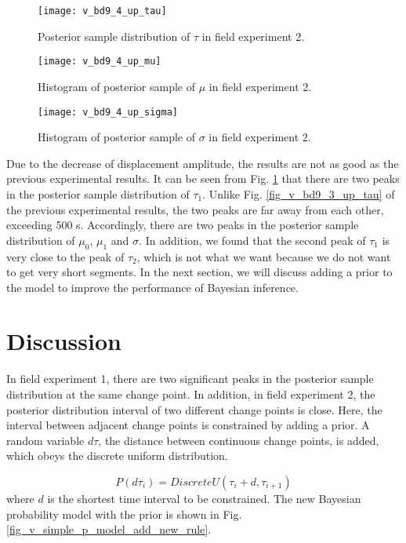 \documentclass[final,3p,times]{elsarticle}
\begin{document}
	\begin{figure}[htbp]
		\centering
		\texttt{[image: v\_bd9\_4\_up\_tau]}
		\caption{Posterior sample distribution of $\tau$ in field experiment 2.}
		\label{fig_v_bd9_4_up_tau}
	\end{figure} 
	\begin{figure}[htbp]
		\centering
		\texttt{[image: v\_bd9\_4\_up\_mu]}
		\caption{Histogram of posterior sample of $\mu$ in field experiment 2.}
		\label{fig_v_bd9_4_up_mu}
	\end{figure} 
	\begin{figure}[htbp]
		\centering
		\texttt{[image: v\_bd9\_4\_up\_sigma]}
		\caption{Histogram of posterior sample of $\sigma$ in field experiment 2.}
		\label{fig_v_bd9_4_up_sigma}
	\end{figure}
	Due to the decrease of displacement amplitude, the results are not as good as the previous experimental results. 
	It can be seen from Fig. \ref{fig_v_bd9_4_up_tau} that there are two peaks in the posterior sample distribution of $\tau_1$. Unlike Fig. \ref{fig_v_bd9_3_up_tau} of the previous experimental results, the two peaks are far away from each other, exceeding 500 s. 
	Accordingly, there are two peaks in the posterior sample distribution of $\mu_0$, $\mu_1$ and $\sigma$. 
	In addition, we found that the second peak of $\tau_1$ is very close to the peak of $\tau_2$, which is not what we want because we do not want to get very short segments. 
	In the next section, we will discuss adding a prior to the model to improve the performance of Bayesian inference.
	\section{Discussion}
	\label{disc}
	In field experiment 1, there are two significant peaks in the posterior sample distribution at the same change point. 
	In addition, in field experiment 2, the posterior distribution interval of two different change points is close.
	Here, the interval between adjacent change points is constrained by adding a prior. 
	A random variable $d\tau$, the distance between continuous change points, is added, which obeys the  discrete uniform distribution.
	
	\begin{equation}\label{eq_bayesian_prior_d_tau}
	P(d\tau_{i})=DiscreteU(\tau_{i} + d,\tau_{i+1})
	\end{equation}
	where $d$ is the shortest time interval to be constrained. The new Bayesian probability model with the prior is shown in Fig. \ref{fig_v_simple_p_model_add_new_rule}.
	
\end{document}
